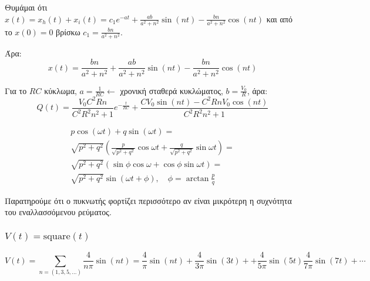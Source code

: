\documentclass[11pt,a4paper,titlepage,final]{article}
\begin{document}
Θυμάμαι ότι \(x(t) = x_h(t)+x_i(t) = c_1e^{-at} + \frac{ab}{a^2+n^2} \sin (nt) -  \frac{bn}{a^2+n^2} \cos (nt)\) και από το \(x(0)=0\) βρίσκω \(c_1 = \frac{bn}{a^2+n^2}\).

Άρα:
\[
x(t) = \frac{bn}{a^2+n^2} + \frac{ab}{a^2+n^2} \sin (nt) -  \frac{bn}{a^2+n^2} \cos (nt)
\]

Για το \(RC\) κύκλωμα, \(a=\frac{1}{RC} \leftarrow \) χρονική σταθερά κυκλώματος, \(b=\frac{V_0}{R}\), άρα:
\[
Q(t) = \frac{V_0C^2Rn}{C^2R^2n^2+1}e^{-\frac{t}{RC}} + \frac{CV_0\sin (nt) - C^2RnV_0 \cos (nt)}{C^2R^2n^2+1}
\]

\begin{attnbox}{}
\begin{align*}
p \cos (\omega t) + q \sin (\omega t) = \\
\sqrt{p^2+q^2} \left( \frac{p}{\sqrt{p^2+q^2}} \cos \omega t+ \frac{q}{\sqrt{p^2+q^2}} \sin \omega t \right) = \\
\sqrt{p^2+q^2} \left ( \sin \phi \cos \omega + \cos \phi \sin \omega t \right) = \\
\sqrt{p^2+q^2} \sin ( \omega t + \phi ), \quad \phi = \arctan \frac{p}{q}
\end{align*}
\end{attnbox}

Παρατηρούμε ότι ο πυκνωτής φορτίζει περισσότερο αν είναι μικρότερη η συχνότητα του εναλλασσόμενου ρεύματος.

\pgfplotsset{width=0.8\textwidth}

\subsubsection{\(V(t) = \mathrm{square}(t)\)}

\[
V(t)= \sum _{n = (1,3,5,\dots)} \frac{4}{n \pi} \sin (n t) =
\frac{4}{ \pi} \sin (n t) + \frac{4}{3 \pi} \sin (3 t) +
+ \frac{4}{5 \pi} \sin (5 t) \frac{4}{7 \pi} \sin (7 t) + \cdots
\]
\end{document}
